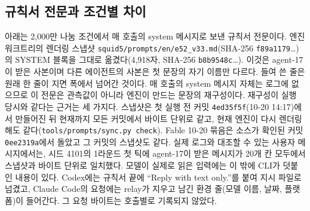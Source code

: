 \subsection{규칙서 전문과 조건별 차이}\label{val:w5-prompt}

아래는 2,000만 나눔 조건에서 매 호출의 system 메시지로 보낸 규칙서 전문이다. 엔진 워크트리의 렌더링 스냅샷 \texttt{squid5/prompts/en/e52\_v33.md}(SHA-256 \texttt{f89a1179}\ldots)의 SYSTEM 블록을 그대로 옮겼다(4,918자, SHA-256 \texttt{b8b9548c}\ldots). 이것은 agent-17이 받은 사본이며 다른 에이전트의 사본은 첫 문장의 자기 이름만 다르다. 들여 쓴 줄은 원래 한 줄이 지면 폭에서 넘어간 것이다. 매 호출의 system 메시지 자체는 로그에 없으므로 이 전문은 관측값이 아니라 엔진이 만드는 문장의 재구성이다. 재구성이 실행 당시와 같다는 근거는 세 가지다. 스냅샷은 첫 실행 전 커밋 \texttt{4ed35f5f}(10-20 14:17)에서 만들어진 뒤 현재까지 모든 커밋에서 바이트 단위로 같고, 현재 엔진이 다시 렌더링해도 같다(\texttt{tools/prompts/sync.py check}). Fable 10-20 묶음은 소스가 확인된 커밋 \texttt{0ee2319a}에서 돌았고 그 커밋의 스냅샷도 같다. 실제 로그와 대조할 수 있는 사용자 메시지에서는, 시드 4101의 1라운드 첫 틱에 agent-17이 받은 메시지가 20개 칸 모두에서 스냅샷과 바이트 단위로 일치했다. 모델이 실제로 읽은 입력에는 이 밖에 CLI가 덧붙인 내용이 있다. Codex에는 규칙서 끝에 ``Reply with text only.''를 붙여 지시 파일로 넘겼고, Claude Code의 요청에는 relay가 지우고 남긴 환경 줄(모델 이름, 날짜, 플랫폼)이 들어간다. 그 요청 바이트는 호출별로 기록되지 않았다.

